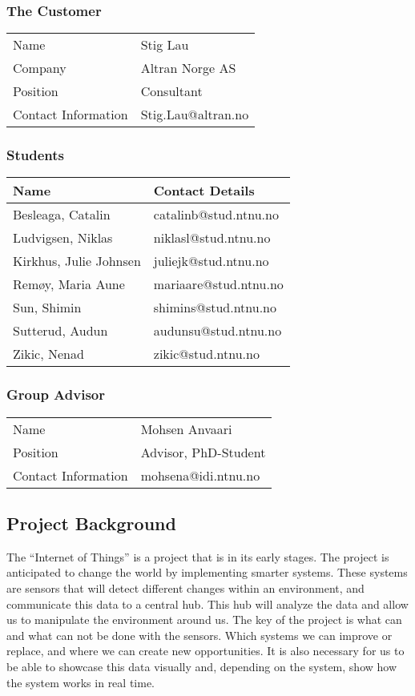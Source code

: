 \documentclass[../document.tex]{subfiles}
\begin{document}
\subsubsection{The Customer}
\begin{tabular}{ll}
\hline
Name					&	Stig Lau\\
Company				&	Altran Norge AS\\
Position				&	Consultant\\
Contact Information		&	Stig.Lau@altran.no\\
\hline
\end{tabular}

\subsubsection{Students}
\begin{tabular}{ll}
\hline
Name				&	Contact Details\\ \hline
Besleaga, Catalin		&	catalinb@stud.ntnu.no\\
Ludvigsen, Niklas		&	niklasl@stud.ntnu.no\\
Kirkhus, Julie Johnsen	&	juliejk@stud.ntnu.no\\
Remøy, Maria Aune		&	mariaare@stud.ntnu.no\\
Sun, Shimin			&	shimins@stud.ntnu.no\\
Sutterud, Audun		&	audunsu@stud.ntnu.no\\
Zikic, Nenad			&	zikic@stud.ntnu.no\\
\hline
\end{tabular}

\subsubsection{Group Advisor}
\begin{tabular}{ll}
\hline
Name				&	Mohsen Anvaari\\
Position			&	Advisor, PhD-Student\\
Contact Information	&	mohsena@idi.ntnu.no\\
\hline
\end{tabular}

\subsection{Project Background}
The “Internet of Things” is a project that is in its early stages. The project is anticipated to change the world by implementing smarter systems. These systems are sensors that will detect different changes within an environment, and communicate this data to a central hub. This hub will analyze the data and allow us to manipulate the environment around us. The key of the project is what can and what can not be done with the sensors. Which systems we can improve or replace, and where we can create new opportunities. It is also necessary for us to be able to showcase this data visually and, depending on the system, show how the system works in real time.
\end{document}
